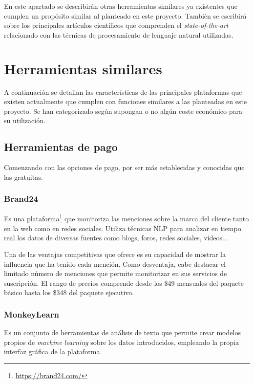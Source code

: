  \label{section:related_works}

En este apartado se describirán otras herramientas similares ya existentes que cumplen un propósito similar al planteado en este proyecto. También se escribirá sobre los principales artículos científicos que comprenden el \textit{state-of-the-art} relacionado con las técnicas de procesamiento de lenguaje natural utilizadas.

\section{Herramientas similares}

A continuación se detallan las características de las principales plataformas que existen actualmente que cumplen con funciones similares a las planteadas en este proyecto. Se han categorizado según supongan o no algún coste económico para su utilización.

\subsection{Herramientas de pago}

Comenzando con las opciones de pago, por ser más establecidas y conocidas que las gratuitas.

\subsubsection{Brand24}

Es una plataforma\footnote{\url{https://brand24.com/}} que monitoriza las menciones sobre la marca del cliente tanto en la web como en redes sociales. Utiliza técnicas NLP para analizar en tiempo real los datos de diversas fuentes como blogs, foros, redes sociales, vídeos...

Una de las ventajas competitivas que ofrece es su capacidad de mostrar la influencia que ha tenido cada mención. Como desventaja, cabe destacar el limitado número de menciones que permite monitorizar en sus servicios de suscripción. El rango de precios comprende desde los \$49 mensuales del paquete básico hasta los \$348 del paquete ejecutivo.

\subsubsection{MonkeyLearn}

Es un conjunto de herramientas de análisis de texto que permite crear modelos propios de \textit{machine learning} sobre los datos introducidos, empleando la propia interfaz gráfica de la plataforma.

